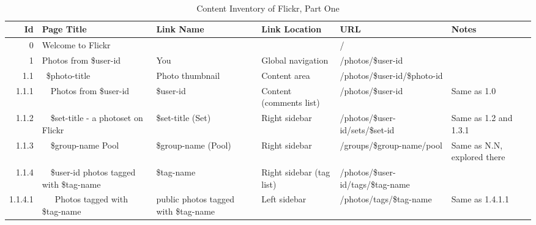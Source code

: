 \documentclass[12pt,a4paper]{article}
\begin{document}
\begin{landscape}
  \begin{table}[h!b!p!]
    \caption{Content Inventory of Flickr, Part One}
    \label{table:flickr.content.inventory.1}
    \begin{center}
      \begin{tiny}
        \tt
        \begin{tabular}{r|l|l|l|l|p{3cm}}
            Id &
            Page Title &
            Link Name &
            Link Location &
            URL &
            Notes \\

            \hline

            0 &
            Welcome to Flickr &
            &
            &
            / &
            \\

            1 &
            Photos from \$user-id &
            You &
            Global navigation &
            /photos/\$user-id &
            \\

              1.1 &
              ~\$photo-title &
              Photo thumbnail &
              Content area &
              /photos/\$user-id/\$photo-id &
              \\

                1.1.1 &
                ~~Photos from \$user-id &
                \$user-id &
                Content (comments list) &
                /photos/\$user-id &
                Same as 1.0\\

                1.1.2 &
                ~~\$set-title - a photoset on Flickr &
                \$set-title (Set) &
                Right sidebar &
                /photos/\$user-id/sets/\$set-id &
                Same as 1.2 and 1.3.1 \\

                1.1.3 &
                ~~\$group-name Pool &
                \$group-name (Pool) &
                Right sidebar &
                /groups/\$group-name/pool &
                Same as N.N, explored there \\

                1.1.4 &
                ~~\$user-id photos tagged with \$tag-name &
                \$tag-name &
                Right sidebar (tag list) &
                /photos/\$user-id/tags/\$tag-name &
                \\

                  1.1.4.1 &
                  ~~~Photos tagged with \$tag-name &
                  public photos tagged with \$tag-name &
                  Left sidebar &
                  /photos/tags/\$tag-name &
                  Same as 1.4.1.1 \\


\end{tabular}
\end{tiny}
\end{center}
\end{table}
\end{landscape}
\end{document}
